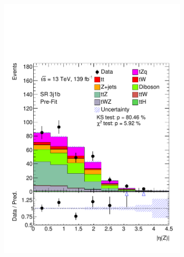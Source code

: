 \begin{figure}[!h] 
  \begin{subfigure}[b]{0.33\linewidth}
    \centering
    \includegraphics[width=\linewidth]{ubonn-thesis/Chapters/Chapters_06/Figure/Input_distribution/SR_3j1b_Z_eta.pdf} 
  \end{subfigure} 
  \begin{subfigure}[b]{0.33\linewidth}
    \centering

\end{subfigure}
\end{figure}
